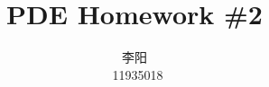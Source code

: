 \documentclass[10pt,a4paper]{article}
\title{PDE Homework \#2}
\author{\begin{CJK*}{UTF8}{gkai}
    李阳
    \end{CJK*}\, 11935018}
\begin{document}
\maketitle

\renewcommand\theenumi{\roman{enumi}}
\renewcommand\labelenumi{(\theenumi)}










\end{document}
